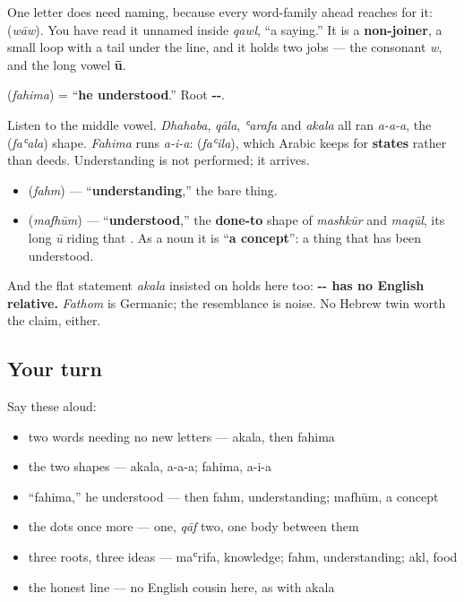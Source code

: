 One letter does need naming, because every word-family ahead reaches for it: \textbf{} (\emph{wāw}). You have read it unnamed inside \emph{qawl}, \textquotedblleft{}a saying.\textquotedblright{} It is a \textbf{non-joiner}, a small loop with a tail under the line, and it holds two jobs — the consonant \emph{w}, and the long vowel \textbf{ū}.

\begin{cousinweb}
\textbf{} (\emph{fahima}) = \textquotedblleft{}\textbf{he understood}.\textquotedblright{} Root \textbf{--}.

Listen to the middle vowel. \emph{Dhahaba}, \emph{qāla}, \emph{ʿarafa} and \emph{akala} all ran \emph{a-a-a}, the \textbf{} (\emph{faʿala}) shape. \emph{Fahima} runs \emph{a-i-a}: \textbf{} (\emph{faʿila}), which Arabic keeps for \textbf{states} rather than deeds. Understanding is not performed; it arrives.

\begin{itemize}
\raggedright
  \item \textbf{} (\emph{fahm}) — \textquotedblleft{}\textbf{understanding},\textquotedblright{} the bare thing.
  \item \textbf{} (\emph{mafhūm}) — \textquotedblleft{}\textbf{understood},\textquotedblright{} the \textbf{done-to} shape of \emph{mashkūr} and \emph{maqūl}, its long \emph{ū} riding that \textbf{}. As a noun it is \textquotedblleft{}\textbf{a concept}\textquotedblright{}: a thing that has been understood.
\end{itemize}

And the flat statement \emph{akala} insisted on holds here too: \textbf{-- has no English relative.} \emph{Fathom} is Germanic; the resemblance is noise. No Hebrew twin worth the claim, either.
\end{cousinweb}

\subsection*{Your turn}
Say these aloud:

\begin{itemize}
\raggedright
  \item two words needing no new letters — akala, then fahima
  \item the two shapes — akala, a-a-a; fahima, a-i-a
  \item \textquotedblleft{}fahima,\textquotedblright{} he understood — then fahm, understanding; mafhūm, a concept
  \item the dots once more —  one, \emph{qāf} two, one body between them
  \item three roots, three ideas — maʿrifa, knowledge; fahm, understanding; akl, food
  \item the honest line — no English cousin here, as with akala
\end{itemize}

